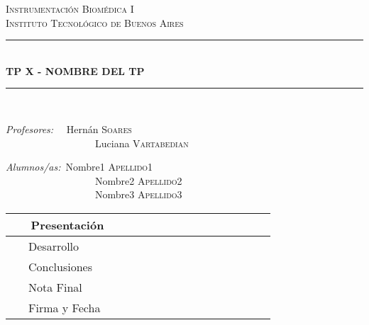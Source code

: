 \documentclass[10pt]{article}
\newcommand{\HRule}{\rule{\linewidth}{0.5mm}}
\begin{document}
\begin{center}

\textsc{\LARGE Instrumentación Biomédica I}\\[0.2cm]
\textsc{\Large Instituto Tecnológico de Buenos Aires}\\[0.2cm]

\HRule \\[0.2cm]
{ \huge \bfseries  TP X - NOMBRE DEL TP \\[0.2cm] }
\HRule \\[1cm]

\begin{multicols}{2}

{\raggedright{}
\large
\emph{Profesores:} \ \  Hernán   \textsc{Soares}\\
\ \ \ \ \ \ \ \ \ \ \ \ \ \ \ \ \ \  Luciana \textsc{Vartabedian} \\
}

\columnbreak
{\raggedright{}
\large
\emph{Alumnos/as:}\  Nombre1  \textsc{Apellido1} \\
\ \ \ \ \ \ \ \ \ \ \ \ \ \ \ \ \ \ Nombre2  \textsc{Apellido2}\\
\  \ \ \ \ \ \ \ \ \ \ \ \ \ \ \ \ \ Nombre3  \textsc{Apellido3}\\
}
\end {multicols}

\vspace{0.5cm}

\begin{adjustbox}{max width=\textwidth}

\tabulinesep=1.8mm

  \begin{tabu}{|  l | c |}
    \hline
     \ \ \ Presentación  &       \ \ \  \ \ \  \ \ \   \ \ \ \ \ \  \\ \hline
     \ \ \ Desarrollo &  \\ \hline
     \ \ \ Conclusiones &   \\ \hline
    \ \ \  Nota Final &  \\ \hline \hline
     \ \ \  Firma y Fecha  \ \ \ \ \ \ \ \ \ &   \\
    \hline
  \end{tabu}
\end{adjustbox}

\end{center}
\end{document}
